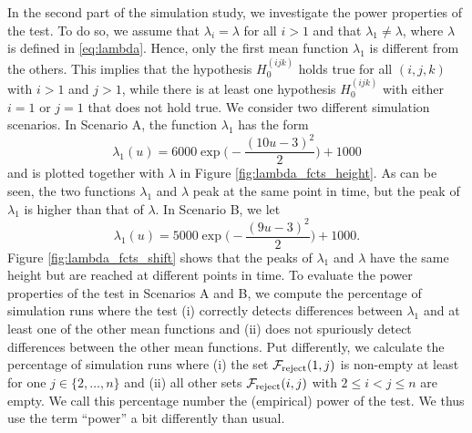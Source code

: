 \documentclass[a4paper,12pt]{article}
\numberwithin{equation}{section}
\begin{document}
In the second part of the simulation study, we investigate the power properties of the test. To do so, we assume that $\lambda_i = \lambda$ for all $i > 1$ and that $\lambda_1 \neq \lambda$, where $\lambda$ is defined in \eqref{eq:lambda}. Hence, only the first mean function $\lambda_1$ is different from the others. This implies that the hypothesis $H_0^{(ijk)}$ holds true for all $(i, j, k)$ with $i > 1$ and $j > 1$, while there is at least one hypothesis $H_0^{(ijk)}$ with either $i = 1$ or $j = 1$ that does not hold true. We consider two different simulation scenarios. In Scenario A, the function $\lambda_1$ has the form 
\[ \lambda_1(u) = 6000 \exp\Big(-\frac{(10 u-3)^2}{2}\Big) + 1000 \]
and is plotted together with $\lambda$ in Figure \ref{fig:lambda_fcts_height}. As can be seen, the two functions $\lambda_1$ and $\lambda$ peak at the same point in time, but the peak of $\lambda_1$ is higher than that of $\lambda$. In Scenario B, we let
\[ \lambda_1(u) = 5000 \exp\Big(-\frac{(9 u-3)^2}{2}\Big) + 1000. \]
Figure \ref{fig:lambda_fcts_shift} shows that the peaks of $\lambda_1$ and $\lambda$ have the same height but are reached at different points in time. To evaluate the power properties of the test in Scenarios A and B, we compute the percentage of simulation runs where the test (i) correctly detects differences between $\lambda_1$ and at least one of the other mean functions and (ii) does not spuriously detect differences between the other mean functions. Put differently, we calculate the percentage of simulation runs where (i) the set $\mathcal{F}_{\text{reject}}(1, j)$ is non-empty at least for one $j \in \{2, \ldots, n\}$ and (ii) all other sets $\mathcal{F}_{\text{reject}}(i, j)$ with $2 \leq i < j \leq n$ are empty. We call this percentage number the (empirical) power of the test. We thus use the term ``power'' a bit differently than usual.  
\end{document}
